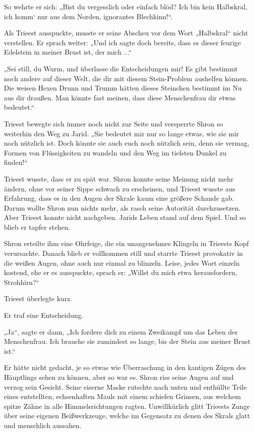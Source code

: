 So wehrte er sich: „Bist du vergesslich oder einfach blöd? Ich bin kein Halbskral, ich komm‘ nur aus dem Norden, ignorantes Blechkinn!“.

Als Trieest ausspuckte, musste er seine Abscheu vor dem Wort „Halbskral“ nicht verstellen. Er sprach weiter: „Und ich sagte doch bereits, dass es dieser feurige Edelstein in meiner Brust ist, der mich ...“

„Sei still, du Wurm, und überlasse die Entscheidungen mir! Es gibt bestimmt noch andere auf dieser Welt, die dir mit diesem Stein-Problem aushelfen können. Die weisen Hexen Drunn und Trumm hätten dieses Steinchen bestimmt im Nu aus dir draußen. Man könnte fast meinen, dass diese Menschenfrau dir etwas bedeutet.“

Trieest bewegte sich immer noch nicht zur Seite und versperrte Shron so weiterhin den Weg zu Jarid. „Sie bedeutet mir nur so lange etwas, wie sie mir noch nützlich ist. Doch könnte sie auch euch noch nützlich sein, denn sie vermag, Formen von Flüssigkeiten zu wandeln und den Weg im tiefsten Dunkel zu finden!“

Trieest wusste, dass er zu spät war. Shron konnte seine Meinung nicht mehr ändern, ohne vor seiner Sippe schwach zu erscheinen, und Trieest wusste aus Erfahrung, dass es in den Augen der Skrale kaum eine größere Schande gab. Darum wollte Shron nun nichts mehr, als rasch seine Autorität durchzusetzen. Aber Trieest konnte nicht nachgeben. Jarids Leben stand auf dem Spiel. Und so blieb er tapfer stehen.

Shron erteilte ihm eine Ohrfeige, die ein unangenehmes Klingeln in Trieests Kopf verursachte. Danach blieb er vollkommen still und starrte Trieest provokativ in die weißen Augen, ohne auch nur einmal zu blinzeln. Leise, jedes Wort einzeln kostend, ehe er es ausspuckte, sprach er: „Willst du mich etwa herausfordern, Strohhirn?“

Trieest überlegte kurz.

Er traf eine Entscheidung.

„Ja“, sagte er dann, „Ich fordere dich zu einem Zweikampf um das Leben der Menschenfrau. Ich brauche sie zumindest so lange, bis der Stein aus meiner Brust ist.“

Er hätte nicht gedacht, je so etwas wie Überraschung in den kantigen Zügen des Häuptlings sehen zu können, aber so war es. Shron riss seine Augen auf und verzog sein Gesicht. Seine eiserne Maske rutschte nach unten und enthüllte Teile eines entstellten, echsenhaften Mauls mit einem schiefen Grinsen, aus welchem spitze Zähne in alle Himmelsrichtungen ragten. Unwillkürlich glitt Trieests Zunge über seine eigenen Beißwerkzeuge, welche im Gegensatz zu denen des Skrals glatt und menschlich aussahen.

